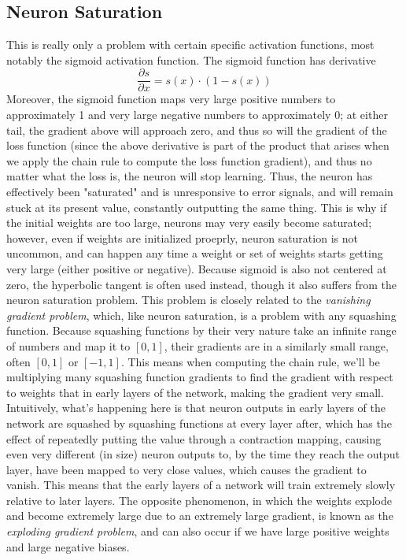 \documentclass{article}
\begin{document}
\subsection{Neuron Saturation}
This is really only a problem with certain specific activation functions, most notably the sigmoid activation function. The sigmoid function has derivative
$$ \frac{\partial s}{\partial x} = s(x) \cdot (1 - s(x)) $$
Moreover, the sigmoid function maps very large positive numbers to approximately 1 and very large negative numbers to approximately 0; at either tail, the gradient above will approach zero, and thus so will the gradient of the loss function (since the above derivative is part of the product that arises when we apply the chain rule to compute the loss function gradient), and thus no matter what the loss is, the neuron will stop learning. Thus, the neuron has effectively been "saturated" and is unresponsive to error signals, and will remain stuck at its present value, constantly outputting the same thing. This is why if the initial weights are too large, neurons may very easily become saturated; however, even if weights are initialized proeprly, neuron saturation is not uncommon, and can happen any time a weight or set of weights starts getting very large (either positive or negative). Because sigmoid is also not centered at zero, the hyperbolic tangent is often used instead, though it also suffers from the neuron saturation problem.
\newline
This problem is closely related to the \textit{vanishing gradient problem}, which, like neuron saturation, is a problem with any squashing function. Because squashing functions by their very nature take an infinite range of numbers and map it to $ [0, 1] $, their gradients are in a similarly small range, often $ [0, 1] $ or $ [-1 , 1] $. This means when computing the chain rule, we'll be multiplying many squashing function gradients to find the gradient with respect to weights that in early layers of the network, making the gradient very small. Intuitively, what's happening here is that neuron outputs in early layers of the network are squashed by squashing functions at every layer after, which has the effect of repeatedly putting the value through a contraction mapping, causing even very different (in size) neuron outputs to, by the time they reach the output layer, have been mapped to very close values, which causes the gradient to vanish. This means that the early layers of a network will train extremely slowly relative to later layers. The opposite phenomenon, in which the weights explode and become extremely large due to an extremely large gradient, is known as the \textit{exploding gradient problem}, and can also occur if we have large positive weights and large negative biases.
\end{document}
